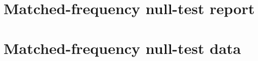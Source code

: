 \documentclass[11pt]{amsart}
\numberwithin{equation}{section}
\theoremstyle{plain}
\theoremstyle{definition}
\theoremstyle{remark}
\newcommand{\1}{\mathbf{1}}
\begin{document}


\section{Matched-frequency null-test report}
\label{app:matched_frequency_report}



\section{Matched-frequency null-test data}
\label{app:matched_frequency_data}


\end{document}
